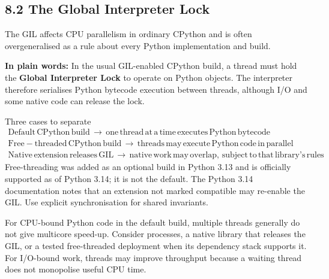 \documentclass[11pt]{article}
\begin{document}
\begin{keepsection}
\section{8.2 The Global Interpreter Lock}

The GIL affects CPU parallelism in ordinary CPython and is often overgeneralised as a rule about every Python implementation and build.

\begin{plainbox}\textbf{In plain words:} In the usual GIL-enabled CPython build, a thread must hold the \textbf{Global Interpreter Lock} to operate on Python objects. The interpreter therefore serialises Python bytecode execution between threads, although I/O and some native code can release the lock.\end{plainbox}

\begin{equationcard}{Three cases to separate}
\[ \begin{gathered} \text{Default}\, \text{CPython}\, \text{build}\, \to \, \text{one}\, \text{thread}\, \text{at}\, \mathrm{a}\, \text{time}\, \text{executes}\, \text{Python}\, \text{bytecode} \\ \text{Free}-\text{threaded}\, \text{CPython}\, \text{build}\, \to \, \text{threads}\, \text{may}\, \text{execute}\, \text{Python}\, \text{code}\, \text{in}\, \text{parallel} \\ \text{Native}\, \text{extension}\, \text{releases}\, \text{GIL}\, \to \, \text{native}\, \text{work}\, \text{may}\, \text{overlap},\, \text{subject}\, \text{to}\, \text{that}\, \text{library}’\mathrm{s}\, \text{rules} \end{gathered} \]
{\small Free-threading was added as an optional build in Python 3.13 and is officially supported as of Python 3.14; it is not the default. The Python 3.14 documentation notes that an extension not marked compatible may re-enable the GIL. Use explicit synchronisation for shared invariants.}
\end{equationcard}

For CPU-bound Python code in the default build, multiple threads generally do not give multicore speed-up. Consider processes, a native library that releases the GIL, or a tested free-threaded deployment when its dependency stack supports it. For I/O-bound work, threads may improve throughput because a waiting thread does not monopolise useful CPU time.


\end{keepsection}
\end{document}
